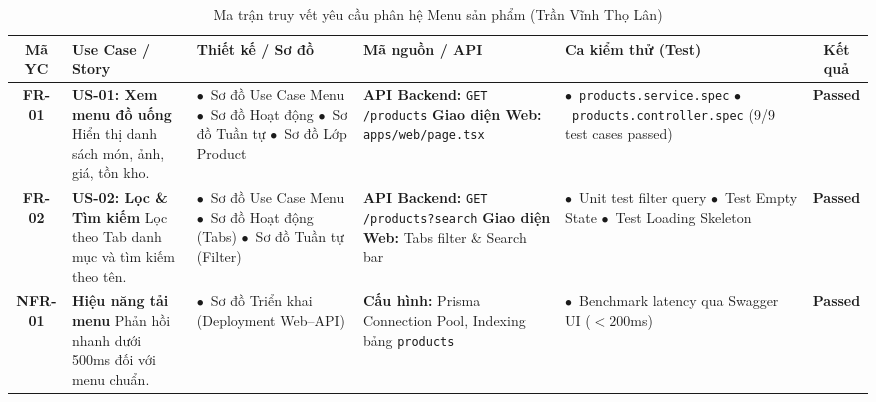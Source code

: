 \documentclass[a4paper]{article}
\begin{document}
\begin{table}[H]
\centering
\small
\begin{tabularx}{\textwidth}{|c|>{\raggedright\arraybackslash}p{2.8cm}|>{\raggedright\arraybackslash}p{2.8cm}|>{\raggedright\arraybackslash}p{2.6cm}|>{\raggedright\arraybackslash}X|c|}
\hline
\textbf{Mã YC} & \textbf{Use Case / Story} & \textbf{Thiết kế / Sơ đồ} & \textbf{Mã nguồn / API} & \textbf{Ca kiểm thử (Test)} & \textbf{Kết quả} \\ \hline
\textbf{FR-01} & 
\textbf{US-01: Xem menu đồ uống} \newline 
Hiển thị danh sách món, ảnh, giá, tồn kho. & 
$\bullet$~Sơ đồ Use Case Menu \newline 
$\bullet$~Sơ đồ Hoạt động \newline 
$\bullet$~Sơ đồ Tuần tự \newline 
$\bullet$~Sơ đồ Lớp Product & 
\textbf{API Backend:} \newline 
\texttt{GET /products} \newline 
\textbf{Giao diện Web:} \newline 
\nolinkurl{apps/web/page.tsx} & 
$\bullet$~\nolinkurl{products.service.spec} \newline 
$\bullet$~\nolinkurl{products.controller.spec} \newline 
(9/9 test cases passed) & 
\textbf{Passed} \\ \hline
\textbf{FR-02} & 
\textbf{US-02: Lọc \& Tìm kiếm} \newline 
Lọc theo Tab danh mục và tìm kiếm theo tên. & 
$\bullet$~Sơ đồ Use Case Menu \newline 
$\bullet$~Sơ đồ Hoạt động (Tabs) \newline 
$\bullet$~Sơ đồ Tuần tự (Filter) & 
\textbf{API Backend:} \newline 
\texttt{GET /products?search} \newline 
\textbf{Giao diện Web:} \newline 
Tabs filter \& Search bar & 
$\bullet$~Unit test filter query \newline 
$\bullet$~Test Empty State \newline 
$\bullet$~Test Loading Skeleton & 
\textbf{Passed} \\ \hline
\textbf{NFR-01} & 
\textbf{Hiệu năng tải menu} \newline 
Phản hồi nhanh dưới 500ms đối với menu chuẩn. & 
$\bullet$~Sơ đồ Triển khai (Deployment Web--API) & 
\textbf{Cấu hình:} \newline 
Prisma Connection Pool, Indexing bảng \texttt{products} & 
$\bullet$~Benchmark latency qua Swagger UI ($<200$ms) & 
\textbf{Passed} \\ \hline
\end{tabularx}
\caption{Ma trận truy vết yêu cầu phân hệ Menu sản phẩm (Trần Vĩnh Thọ Lân)}
\label{tab:traceability_menu}
\end{table}
\end{document}
